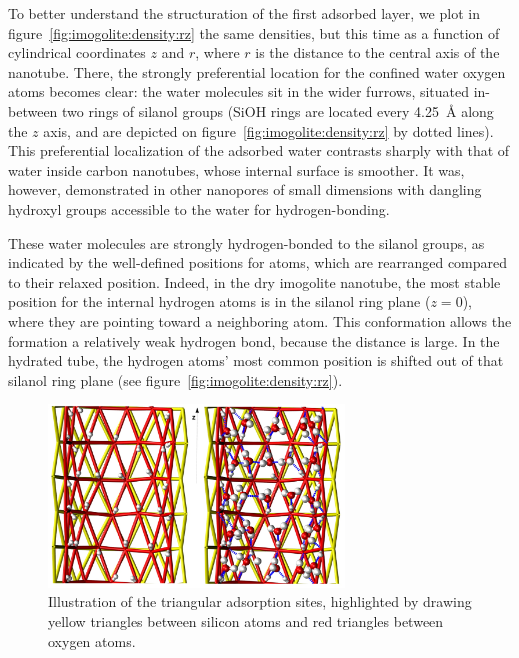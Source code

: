 \documentclass[thesis]{subfiles}
\begin{document}
To better understand the structuration of the first adsorbed layer, we plot in
figure~\ref{fig:imogolite:density:rz} the same densities, but this time as a
function of cylindrical coordinates $z$ and $r$, where $r$ is the distance
to the central axis of the nanotube. There, the strongly preferential location
for the confined water oxygen atoms becomes clear: the water molecules sit in
the wider furrows, situated in-between two rings of silanol groups (SiOH rings
are located every \SI{4.25}{\AA} along the $z$ axis, and are depicted on
figure~\ref{fig:imogolite:density:rz} by dotted lines). This preferential
localization of the adsorbed water contrasts sharply with that of water inside
carbon nanotubes, whose internal surface is smoother. It was, however,
demonstrated in other nanopores of small dimensions with dangling hydroxyl
groups accessible to the water for hydrogen-bonding\cite{Haigis2013}.

These water molecules are strongly hydrogen-bonded to the silanol groups, as
indicated by the well-defined positions for  atoms, which are
rearranged compared to their relaxed position. Indeed, in the dry imogolite
nanotube, the most stable position for the internal hydrogen atoms is in the
silanol ring plane ($z = 0$), where they are pointing toward a neighboring
 atom. This conformation allows the formation a relatively weak
hydrogen bond, because the  distance is
large. In the hydrated tube, the hydrogen atoms' most common position is shifted
out of that silanol ring plane (see figure~\ref{fig:imogolite:density:rz}).


\begin{figure}[p]
	\centering
	\includegraphics[width=0.7\textwidth]{figures/images/imogolite-hbonds-sites}
	\caption{Illustration of the triangular adsorption sites, highlighted by
    drawing yellow triangles between silicon atoms and red triangles between
    oxygen atoms.}
    \label{fig:imogolite:hbonds:sites}
\end{figure}
\end{document}
